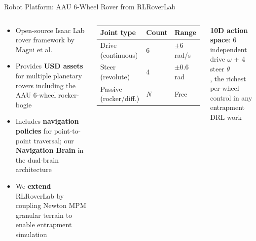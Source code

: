 \documentclass[aspectratio=169, 10pt]{beamer}
\newcommand{\keyword}[1]{\textbf{\color{MarsLight}#1}}
\begin{document}
\begin{frame}{Robot Platform: AAU 6-Wheel Rover from RLRoverLab}
\begin{columns}[T]
\begin{tcolorbox}[mycard, title={\faInfo\; About RLRoverLab}]
  \scriptsize
  \begin{itemize}[leftmargin=1em, itemsep=1pt]
    \item Open-source Isaac Lab rover framework by Magni et al.
    \item Provides \keyword{USD assets} for multiple planetary rovers including the AAU 6-wheel rocker-bogie
    \item Includes \keyword{navigation policies} for point-to-point traversal; our \textbf{Navigation Brain} in the dual-brain architecture
    \item We \keyword{extend} RLRoverLab by coupling Newton MPM granular terrain to enable entrapment simulation
  \end{itemize}
\end{tcolorbox}
\vspace{0.15em}
\begin{tcolorbox}[mycard, title={\faCog\; AAU Rover Joint Configuration}]
  \scriptsize
  \begin{tabular}{@{}lll@{}}
    \toprule
    \rowcolor{MarsRust!8}
    \textbf{Joint type} & \textbf{Count} & \textbf{Range} \\
    \midrule
    \rowcolor{CardBg}
    Drive (continuous) & 6 & $\pm6$\,rad/s \\
    \rowcolor{CardBg}
    Steer (revolute) & 4 & $\pm0.6$\,rad \\
    \rowcolor{CardBg}
    Passive (rocker/diff.) & \textit{N} & Free \\
    \bottomrule
  \end{tabular}
\end{tcolorbox}
\vspace{0.3em}
\begin{tcolorbox}[highlight]
  \scriptsize\centering
  \textbf{10D action space}: 6 independent drive $\omega$ + 4 steer $\theta$\\
, the richest per-wheel control in any entrapment DRL work
\end{tcolorbox}
\end{columns}
\end{frame}
\end{document}
